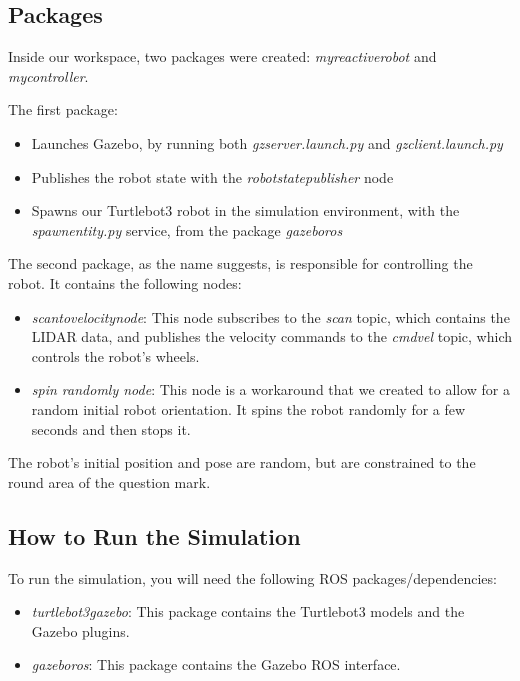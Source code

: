 \documentclass[conference]{IEEEtran}
\begin{document}
\subsection{Packages}

Inside our workspace, two packages were created: \emph{my\textunderscore reactive\textunderscore robot} and \emph{my\textunderscore controller}.

The first package:
\begin{itemize}
    \item Launches Gazebo, by running both \emph{gzserver.launch.py} and \emph{gzclient.launch.py}
    \item Publishes the robot state with the \emph{robot\textunderscore state\textunderscore publisher} node
    \item Spawns our Turtlebot3 robot in the simulation environment, with the \emph{spawn\textunderscore entity.py} service,
          from the package \emph{gazebo\textunderscore ros}
\end{itemize}

The second package, as the name suggests, is responsible for controlling the robot. It contains the following nodes:
\begin{itemize}
    \item \emph{scan\textunderscore to\textunderscore velocity\textunderscore node}: This node subscribes to
          the \emph{scan} topic, which contains the LIDAR data, and publishes the velocity commands to
          the \emph{cmd\textunderscore vel} topic, which controls the robot's wheels.
    \item \emph{spin \textunderscore randomly \textunderscore node}: This node is a workaround that we created to allow for a random initial
          robot orientation. It spins the robot randomly for a few seconds and then stops it.
\end{itemize}

The robot's initial position and pose are random, but are constrained to the round area of the question mark.

\subsection{How to Run the Simulation}\label{sec:run}

To run the simulation, you will need the following ROS packages/dependencies:

\begin{itemize}
    \item \emph{turtlebot3\textunderscore gazebo}: This package contains the Turtlebot3 models and the Gazebo plugins.
    \item \emph{gazebo\textunderscore ros}: This package contains the Gazebo ROS interface.
\end{itemize}
\end{document}
